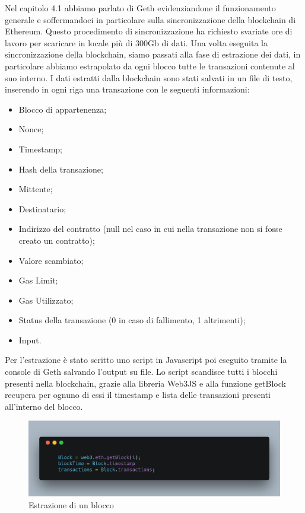 \documentclass[12pt]{report}
\begin{document}
Nel capitolo 4.1 abbiamo parlato di Geth evidenziandone il funzionamento generale e soffermandoci in particolare sulla sincronizzazione della blockchain di Ethereum. Questo procedimento di sincronizzazione ha richiesto svariate ore di lavoro per scaricare in locale più di 300Gb di dati.
Una volta eseguita la sincronizzazione della blockchain, siamo passati alla fase di estrazione dei dati, in particolare abbiamo estrapolato da ogni blocco tutte le transazioni contenute al suo interno.
I dati estratti dalla blockchain sono stati salvati in un file di testo, inserendo in ogni riga una transazione con le seguenti informazioni:
\begin{itemize}
\item Blocco di appartenenza;
\item Nonce;
\item Timestamp;
\item Hash della transazione;
\item Mittente;
\item Destinatario;
\item Indirizzo del contratto (null nel caso in cui nella transazione non si fosse creato un contratto);
\item Valore scambiato;
\item Gas Limit;
\item Gas Utilizzato;
\item Status della transazione (0 in caso di fallimento, 1 altrimenti);
\item Input.
\end{itemize}

Per l'estrazione è stato scritto uno script in Javascript poi eseguito tramite la console di Geth salvando l'output su file.
Lo script scandisce tutti i blocchi presenti nella blockchain, grazie alla libreria Web3JS e alla funzione getBlock recupera per ognuno di essi il timestamp e lista delle transazioni presenti all'interno del blocco.

\begin{figure}[H]
    \includegraphics[width=\textwidth]{carbon-19}
    \caption{Estrazione di un blocco}
\end{figure}
\end{document}
